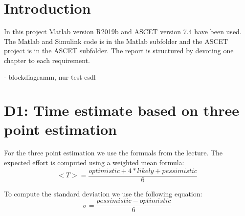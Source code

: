 
\chapter{Introduction}\label{cha:Introduction}
In this project Matlab version R2019b and ASCET version 7.4 have been used.
The Matlab and Simulink code is in the Matlab subfolder and the ASCET project is in the ASCET subfolder.
The report is structured by devoting one chapter to each requirement.

- blockdiagramm, nur test esdl

\chapter{D1: Time estimate based on three point estimation}\label{cha:D1}
For the three point estimation we use the formuals from the lecture.
The expected effort is computed using a weighted mean formula:
\begin{equation}
	<T> = \frac{optimistic + 4*likely + pessimistic}{6}
\end{equation}

To compute the standard deviation we use the following equation:
\begin{equation}
	\sigma = \frac{pessimistic-optimistic}{6}
\end{equation}

